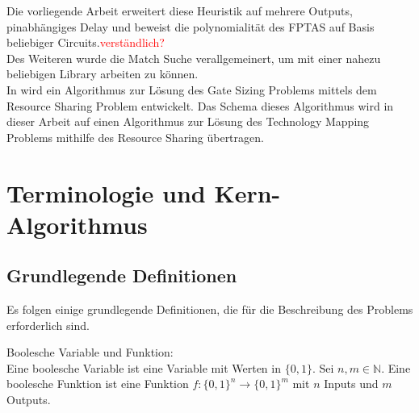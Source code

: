 \documentclass[11pt, a4paper, german]{article}
\newcommand{\TM}{Technology  Mapping }
\begin{document}
Die vorliegende Arbeit erweitert diese Heuristik auf mehrere Outputs, pinabhängiges Delay und beweist die polynomialit\"at des FPTAS auf Basis beliebiger Circuits.\textcolor{red}{verst\"andlich?}\\ Des Weiteren wurde die Match Suche verallgemeinert, um mit einer nahezu beliebigen Library arbeiten zu k\"onnen.\\

In \cite{Daboul2018} wird ein Algorithmus zur L\"osung des Gate Sizing Problems mittels dem Resource Sharing Problem entwickelt. Das Schema dieses Algorithmus wird in dieser Arbeit auf einen Algorithmus zur L\"osung des \TM Problems mithilfe des Resource Sharing \"ubertragen.

\section{Terminologie und Kern-Algorithmus}
\label{sec:terminologie&grundl}
\subsection{Grundlegende Definitionen}
\label{subsec:grundlegende_definitionen}
Es folgen einige grundlegende Definitionen, die für die Beschreibung des Problems erforderlich sind.

\begin{definition}{Boolesche Variable und Funktion: } \\
Eine boolesche Variable ist eine Variable mit Werten in $ \{ 0 , 1 \} $.
Sei $ n, m \in \mathbb{N}$. Eine boolesche Funktion ist eine Funktion $ f : \{ 0 , 1 \}^n \rightarrow \{ 0 , 1 \}^m $ mit $n$ Inputs und $m$ Outputs. 
\end{definition}
\end{document}

